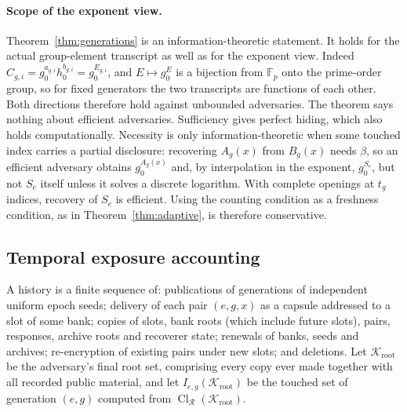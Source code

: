 \documentclass[pdflatex,sn-mathphys-num]{sn-jnl}%
\theoremstyle{plain}
\theoremstyle{definition}
\newcommand{\Cl}{\operatorname{Cl}}
\newcommand{\F}{\mathbb{F}}
\begin{document}
\paragraph{Scope of the exponent view.}
Theorem~\ref{thm:generations} is an information-theoretic statement. It holds for the actual group-element transcript as well as for the exponent view. Indeed $C_{g,i}=g_0^{a_{g,i}}h_0^{b_{g,i}}=g_0^{E_{g,i}}$, and $E\mapsto g_0^E$ is a bijection from $\F_p$ onto the prime-order group, so for fixed generators the two transcripts are functions of each other. Both directions therefore hold against unbounded adversaries. The theorem says nothing about efficient adversaries. Sufficiency gives perfect hiding, which also holds computationally. Necessity is only information-theoretic when some touched index carries a partial disclosure: recovering $A_g(x)$ from $B_g(x)$ needs $\beta$, so an efficient adversary obtains $g_0^{A_g(x)}$ and, by interpolation in the exponent, $g_0^{S_e}$, but not $S_e$ itself unless it solves a discrete logarithm. With complete openings at $t_g$ indices, recovery of $S_e$ is efficient. Using the counting condition as a freshness condition, as in Theorem~\ref{thm:adaptive}, is therefore conservative.

\subsection{Temporal exposure accounting}
A history is a finite sequence of: publications of generations of independent uniform epoch seeds; delivery of each pair $(e,g,x)$ as a capsule addressed to a slot of some bank; copies of slots, bank roots (which include future slots), pairs, responses, archive roots and recoverer state; renewals of banks, seeds and archives; re-encryption of existing pairs under new slots; and deletions. Let $\mathcal K_{\mathrm{root}}$ be the adversary's final root set, comprising every copy ever made together with all recorded public material, and let $I_{e,g}(\mathcal K_{\mathrm{root}})$ be the touched set of generation $(e,g)$ computed from $\Cl_{\mathcal R}(\mathcal K_{\mathrm{root}})$.
\end{document}
